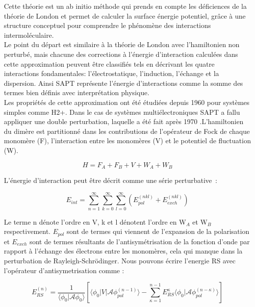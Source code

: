 
Cette théorie est un ab initio méthode qui prends en compte les déficiences de la théorie de London et permet de calculer la surface énergie potentiel, grâce à une structure conceptuel pour comprendre le phénomène des interactions intermoléculaire.\\

Le point du départ est similaire à la théorie de London avec l'hamiltonien non perturbé, mais chacune des corrections à l’énergie d’interaction calculées dans cette approximation peuvent être classifiés tels en décrivant les quatre interactions fondamentales: l’électrostatique,  l’induction, l’échange et la dispersion. Ainsi SAPT représente l’énergie d’interactions comme la somme des termes bien définis avec interprétation physique.\\

Les propriétés de cette approximation ont été étudiées depuis 1960 pour systèmes simples comme H2+. Dans le cas de systèmes multiélectroniques SAPT a fallu appliquer une double perturbation, laquelle a été fait après 1970 \cite{szalewicz1979symmetry}.L’hamiltonien du dimère est partitionné dans les contributions de l’opérateur de Fock de chaque monomère (F), l’interaction entre les monomères (V) et le potentiel de fluctuation (W).

\begin{equation}
H = F_{A} + F_{B} + V + W_{A} + W_{B}
\end{equation}

L’énergie d’interaction peut être décrit comme une série perturbative :

\begin{equation}
E_{int} = \sum_{n=1}^{\infty} \sum_{k=0}^{\infty} \sum_{l=0}^{\infty} (E_{pol}^{(nkl)}+ E_{exch}^{(nkl)}) \label{serie}
\end{equation}

Le terme n dénote l’ordre en V, k et l dénotent l’ordre en W$_{A}$ et W$_{B}$ respectivement. $E_{pol}$ sont de termes qui viennent de l’expansion de la polarisation et $E_{exch}$ sont de termes résultants de l’antisymétrisation de la fonction d’onde par rapport à l’échange des électrons entre les monomères, cela qui manque dans la perturbation de Rayleigh-Schr\"{o}dinger. Nous pouvons écrire l'energie RS avec l'opérateur d'antisymetrisation comme :

\begin{equation}
E_{RS}^{(n)} = \frac{1}{\langle\phi_{0}|\mathscr{A}\phi_{0}\rangle} \left[\langle\phi_{0} | V| \mathscr{A} \phi_{pol}^{(n-1)}\rangle - \sum_{\kappa=1}^{n-1} E_{RS}^{\kappa} \langle \phi_{0}|\mathscr{A} \phi_{pol}^{(n-\kappa)}\rangle\right]
\end{equation}

